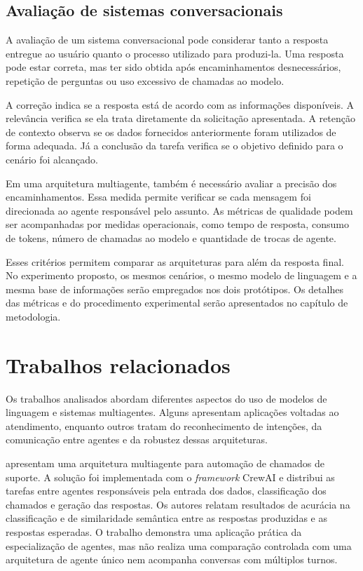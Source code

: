 \subsection{Avaliação de sistemas conversacionais}
\label{subsec:avaliacao-conversacional}

A avaliação de um sistema conversacional pode considerar tanto a resposta entregue ao usuário quanto o processo utilizado para produzi-la. Uma resposta pode estar correta, mas ter sido obtida após encaminhamentos desnecessários, repetição de perguntas ou uso excessivo de chamadas ao modelo.

A correção indica se a resposta está de acordo com as informações disponíveis. A relevância verifica se ela trata diretamente da solicitação apresentada. A retenção de contexto observa se os dados fornecidos anteriormente foram utilizados de forma adequada. Já a conclusão da tarefa verifica se o objetivo definido para o cenário foi alcançado.

Em uma arquitetura multiagente, também é necessário avaliar a precisão dos encaminhamentos. Essa medida permite verificar se cada mensagem foi direcionada ao agente responsável pelo assunto. As métricas de qualidade podem ser acompanhadas por medidas operacionais, como tempo de resposta, consumo de tokens, número de chamadas ao modelo e quantidade de trocas de agente.

Esses critérios permitem comparar as arquiteturas para além da resposta final. No experimento proposto, os mesmos cenários, o mesmo modelo de linguagem e a mesma base de informações serão empregados nos dois protótipos. Os detalhes das métricas e do procedimento experimental serão apresentados no capítulo de metodologia.

\section{Trabalhos relacionados}
\label{sec:trabalhos-relacionados}

Os trabalhos analisados abordam diferentes aspectos do uso de modelos de linguagem e sistemas multiagentes. Alguns apresentam aplicações voltadas ao atendimento, enquanto outros tratam do reconhecimento de intenções, da comunicação entre agentes e da robustez dessas arquiteturas.

\textcite{moncada2025} apresentam uma arquitetura multiagente para automação de chamados de suporte. A solução foi implementada com o \textit{framework} CrewAI e distribui as tarefas entre agentes responsáveis pela entrada dos dados, classificação dos chamados e geração das respostas. Os autores relatam resultados de acurácia na classificação e de similaridade semântica entre as respostas produzidas e as respostas esperadas. O trabalho demonstra uma aplicação prática da especialização de agentes, mas não realiza uma comparação controlada com uma arquitetura de agente único nem acompanha conversas com múltiplos turnos.

